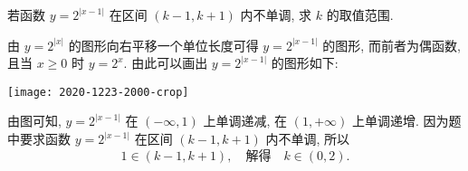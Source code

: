 \begin{example}
    若函数 $y= 2^{|x-1|}$ 在区间 $(k-1,k+1)$ 内不单调, 求 $k$ 的取值范围.
\end{example}
\begin{solution}
    由 $y=2^|x|$ 的图形向右平移一个单位长度可得 $y= 2^{|x-1|}$ 的图形, 而前者为偶函数, 且当 $x\geqslant 0$ 时 $y=2^x$. 由此可以画出 $y= 2^{|x-1|}$ 的图形如下:
    
    \begin{center}
        \texttt{[image: 2020-1223-2000-crop]}
    \end{center}
    
    由图可知, $y= 2^{|x-1|}$ 在 $(-\infty,1)$ 上单调递减, 在 $(1,+\infty)$ 上单调递增. 因为题中要求函数 $y= 2^{|x-1|}$ 在区间 $(k-1,k+1)$ 内不单调, 所以
    \[1\in(k-1,k+1),\quad\text{解得}\quad k\in(0,2).\]
\end{solution}